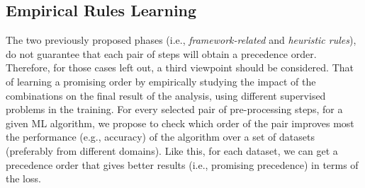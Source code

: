 \subsection{Empirical Rules Learning}
\label{effective-ssec:rules-learned}

The two previously proposed phases (i.e., \textit{framework-related} and \textit{heuristic rules}), do not guarantee that each pair of steps will obtain a precedence order.
Therefore, for those cases left out, a third viewpoint should be considered.
That of learning a promising order by empirically studying the impact of the combinations on the final result of the analysis, using different supervised problems in the training.
For every selected pair of pre-processing steps, for a given ML algorithm, we propose to check which order of the pair improves most the performance (e.g., accuracy) of the algorithm over a set of datasets (preferably from different domains).
Like this, for each dataset, we can get a precedence order that gives better results (i.e., promising precedence) in terms of the loss.


